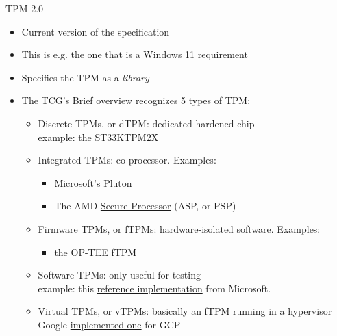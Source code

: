 \begin{frame}{TPM 2.0}
  \begin{itemize}
    \item Current version of the specification
    \item This is e.g. the one that is a Windows 11 requirement
    \item Specifies the TPM as a \textit{library}
    \item The TCG's \href{https://trustedcomputinggroup.org/wp-content/uploads/2019_TCG_TPM2_BriefOverview_DR02web.pdf}{Brief overview}
          recognizes 5 types of TPM:
    \begin{itemize}
      \item Discrete TPMs, or dTPM: dedicated hardened chip\\
            example: the \href{<https://www.st.com/en/secure-mcus/st33ktpm2x.html}{ST33KTPM2X}
      \item Integrated TPMs: co-processor. Examples:
      \begin{itemize}
        \item Microsoft's \href{https://learn.microsoft.com/en-us/windows/security/hardware-security/pluton/microsoft-pluton-security-processor}{Pluton}
        \item The AMD \href{https://dayzerosec.com/blog/2023/04/17/reversing-the-amd-secure-processor-psp.html}{Secure Processor} (ASP, or PSP)
      \end{itemize}
      \item Firmware TPMs, or fTPMs: hardware-isolated software. Examples:
      \begin{itemize}
        \item the \href{https://github.com/OP-TEE/optee_ftpm}{OP-TEE fTPM}
      \end{itemize}
      \item Software TPMs: only useful for testing\\
            example: this \href{https://github.com/microsoft/ms-tpm-20-ref}{reference implementation}
            from Microsoft.
      \item Virtual TPMs, or vTPMs: basically an fTPM running in a hypervisor\\
            Google \href{https://cloud.google.com/blog/products/identity-security/virtual-trusted-platform-module-for-shielded-vms-security-in-plaintext?hl=en}{implemented one}
            for GCP
    \end{itemize}
  \end{itemize}
\end{frame}

